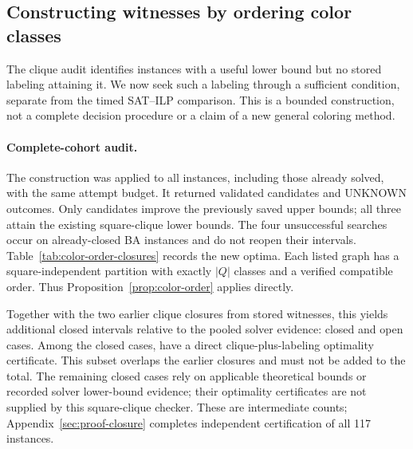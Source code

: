 \subsection{Constructing witnesses by ordering color classes}
\label{sec:color-order-results}
The clique audit identifies instances with a useful lower bound but no
stored labeling attaining it. We now seek such a labeling through a
sufficient condition, separate from the timed SAT--ILP comparison.
This is a bounded construction, not a complete decision procedure or a
claim of a new general coloring method.



\paragraph{Complete-cohort audit.}
The construction was applied to all \ConstructionInstances{} instances,
including those already solved, with the same attempt budget.
It returned \ConstructionCandidates{} validated candidates and
\ConstructionUnknown{} UNKNOWN outcomes. Only \ConstructionImproved{}
candidates improve the previously saved upper bounds; all three attain
the existing square-clique lower bounds. The four unsuccessful searches
occur on already-closed BA instances and do not reopen their intervals.
Table~\ref{tab:color-order-closures} records the new optima. Each listed
graph has a square-independent partition with exactly $|Q|$ classes and
a verified compatible order. Thus Proposition~\ref{prop:color-order}
applies directly.

\begin{table}[htbp]
\centering\small
\caption{Optima certified by new color-order witnesses.}
\label{tab:color-order-closures}

\end{table}

Together with the two earlier clique closures from stored witnesses,
this yields \ConstructionTotalNewlyClosed{} additional closed intervals
relative to the pooled solver evidence: \ConstructionClosed{} closed
and \ConstructionOpen{} open cases. Among the closed cases,
\ConstructionCliqueCertified{} have a direct clique-plus-labeling
optimality certificate. This subset overlaps the earlier closures and
must not be added to the total. The remaining closed cases rely on
applicable theoretical bounds or recorded solver lower-bound evidence;
their optimality certificates are not supplied by this square-clique checker.
These are intermediate counts; Appendix~\ref{sec:proof-closure} completes
independent certification of all 117 instances.

